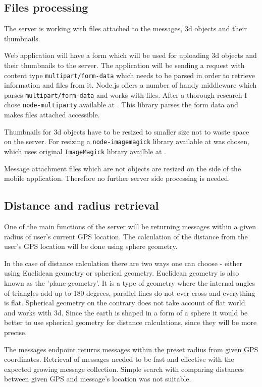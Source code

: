 \documentclass[thesis=M,english]{FITthesis}[2012/10/20]
\begin{document}
\subsection{Files processing}

The server is working with files attached to the messages, 3d objects and their thumbnails. 

Web application will have a form which will be used for uploading 3d objects and their thumbnails to the server. The application will be sending a request with content type  \verb|multipart/form-data| which needs to be parsed in order to retrieve information and files from it. Node.js offers a number of handy middleware which parses \verb|multipart/form-data| and works with files. After a thorough research I chose \verb|node-multiparty| available at \cite{multiparty}. This library parses the form data and makes files attached accessible. 

Thumbnails for 3d objects have to be resized to smaller size not to waste space on the server. For resizing  a \verb|node-imagemagick| library available at \cite{node-imagemagick} was chosen, which uses original \verb|ImageMagick| library availble at \cite{imagemagick}.

Message attachment files which are not objects are resized on the side of the mobile application. Therefore no further server side processing is needed. 

\subsection{Distance and radius retrieval}

One of the main functions of the server will be returning messages within a given radius of user's current GPS location. The calculation of the distance from the user's GPS location will be done using sphere geometry.

In the case of distance calculation there are two ways one can choose - either using Euclidean geometry or spherical geometry. Euclidean geometry is also known as the 'plane geometry'. It is a type of geometry where the internal angles of triangles add up to 180 degrees, parallel lines do not ever cross and everything is flat. Spherical geometry on the contrary does not take account of flat world and works with 3d. Since the earth is shaped in a form of a sphere it would be better to use spherical geometry for distance calculations, since they will be more precise.

The messages endpoint returns messages within the preset radius from given GPS coordinates. Retrieval of messages needed to be fast and effective with the expected growing message collection. Simple search with comparing distances between given GPS and message's location was not suitable. 
\end{document}

